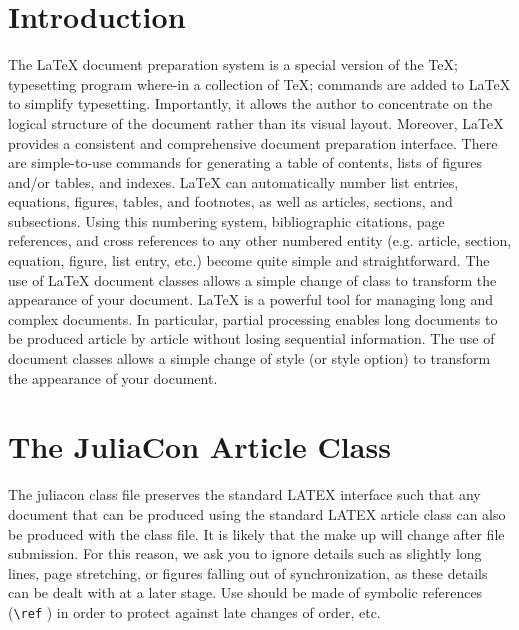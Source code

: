 \documentclass{juliacon}
\begin{document}


\maketitle

\begin{abstract}

This is a guide for authors who are preparing papers for JuliaCon using the \LaTeX{} document
preparation system and the \verb|juliacon|  class file.

\end{abstract}

\section{Introduction}

The \LaTeX{} document preparation system is a special version of the
\TeX; typesetting program where-in a collection of \TeX; commands
are added to \LaTeX{} to simplify typesetting. Importantly, it allows
the author to concentrate on the logical structure of the document
rather than its visual layout.\vskip 6pt
Moreover, \LaTeX{} provides a consistent and comprehensive document
preparation interface. There are simple-to-use commands for
generating a table of contents, lists of figures and/or tables, and indexes.
\LaTeX{} can automatically number list entries, equations, figures,
tables, and footnotes, as well as articles, sections, and subsections.
Using this numbering system, bibliographic citations, page
references, and cross references to any other numbered entity (e.g.
article, section, equation, figure, list entry, etc.) become quite simple
and straightforward. The use of \LaTeX{} document classes allows
a simple change of class to transform the appearance of your document.\vskip 6pt
\LaTeX{} is a powerful tool for managing long and complex documents.
In particular, partial processing enables long documents to
be produced article by article without losing sequential information.
The use of document classes allows a simple change of style
(or style option) to transform the appearance of your document.



\section{The JuliaCon Article Class}
\label{sec:documentclass}
%
The juliacon class file preserves the standard LATEX{} interface such
that any document that can be produced using the standard LATEX{}
article class can also be produced with the class file.\vskip 6pt
It is likely that the make up will change after file submission. For
this reason, we ask you to ignore details such as slightly long lines,
page stretching, or figures falling out of synchronization, as these
details can be dealt with at a later stage.\vskip 6pt
Use should be made of symbolic references (\verb|\ref| ) in order to
protect against late changes of order, etc.
\end{document}
